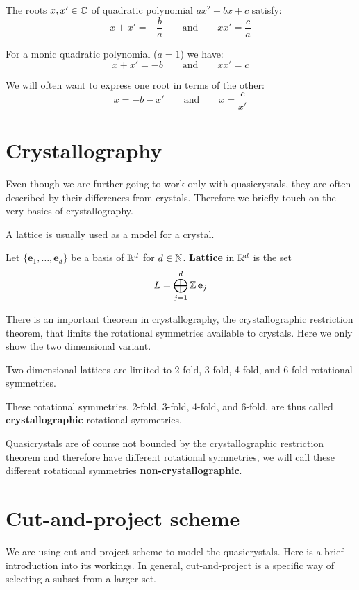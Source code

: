 \documentclass[text.tex]{subfiles}
\begin{document}
The roots $x,x'\in\mathbb{C}$ of quadratic polynomial $ax^2+bx+c$ satisfy: 
$$x+x'=-\frac{b}{a}\qquad\text{and}\qquad xx'=\frac{c}{a}$$

For a monic quadratic polynomial ($a=1$) we have:
$$x+x'=-b\qquad\text{and}\qquad xx'=c$$

We will often want to express one root in terms of the other: 
$$x=-b-x'\qquad\text{and}\qquad x=\frac{c}{x'}$$


\section{Crystallography}\label{sec_crystallography}%
Even though we are further going to work only with quasicrystals, they are often described by their differences from crystals. Therefore we briefly touch on the very basics of crystallography. 

A lattice is usually used as a model for a crystal. 

\begin{definition}
Let $\{\mathbf{e}_1, \dots, \mathbf{e}_d\}$ be a basis of $\mathbb{R}^d$ for $d\in\mathbb{N}$. \textbf{Lattice} in $\mathbb{R}^d$ is the set
$$L = \bigoplus^d_{j=1}\mathbb{Z}\, \mathbf{e}_j$$
\end{definition}

There is an important theorem in crystallography, the crystallographic restriction theorem, that limits the rotational symmetries available to crystals. Here we only show the two dimensional variant. 

\begin{theorem}
Two dimensional lattices are limited to 2-fold, 3-fold, 4-fold, and 6-fold rotational symmetries. 
\end{theorem}

These rotational symmetries, 2-fold, 3-fold, 4-fold, and 6-fold, are thus called \textbf{crystallographic} rotational symmetries. 

Quasicrystals are of course not bounded by the crystallographic restriction theorem and therefore have different rotational symmetries, we will call these different rotational symmetries \textbf{non-crystallographic}.

\section{Cut-and-project scheme}\label{sec_cutAndProject}%
We are using cut-and-project scheme to model the quasicrystals. Here is a brief introduction into its workings. In general, cut-and-project is a specific way of selecting a subset from a larger set.
\end{document}
